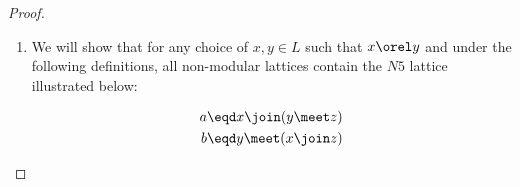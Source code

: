 \begin{proof}
\begin{enumerate}
\begin{enumerate}
      \item \label{item:lat_mod_iff_N5_def}
            We will show that for any choice of $x,y\in L$ such that $x\orel y$ and
            under the following definitions,
            all non-modular lattices contain the $N5$ lattice illustrated below:\\
        \hfill%
        \begin{minipage}{\tw-46mm-22mm}
          \begin{align*}
            a &\eqd x\join(y\meet z) \\
            b &\eqd y\meet(x\join z)
          \end{align*}
        \end{minipage}%
        \hfill{}%


\end{enumerate}
\end{enumerate}
\end{proof}
